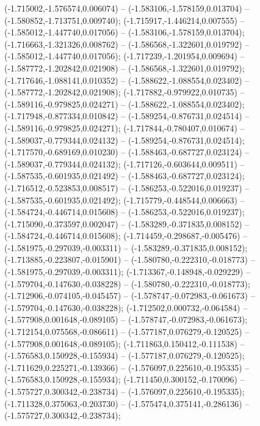  (-1.715002,-1.576574,0.006074) -- (-1.583106,-1.578159,0.013704) -- (-1.580852,-1.713751,0.009740);
 (-1.715917,-1.446214,0.007555) -- (-1.585012,-1.447740,0.017056) -- (-1.583106,-1.578159,0.013704);
 (-1.716663,-1.321326,0.008762) -- (-1.586568,-1.322601,0.019792) -- (-1.585012,-1.447740,0.017056);
 (-1.717239,-1.201954,0.009694) -- (-1.587772,-1.202842,0.021908) -- (-1.586568,-1.322601,0.019792);
 (-1.717646,-1.088141,0.010352) -- (-1.588622,-1.088554,0.023402) -- (-1.587772,-1.202842,0.021908);
 (-1.717882,-0.979922,0.010735) -- (-1.589116,-0.979825,0.024271) -- (-1.588622,-1.088554,0.023402);
 (-1.717948,-0.877334,0.010842) -- (-1.589254,-0.876731,0.024514) -- (-1.589116,-0.979825,0.024271);
 (-1.717844,-0.780407,0.010674) -- (-1.589037,-0.779344,0.024132) -- (-1.589254,-0.876731,0.024514);
 (-1.717570,-0.689169,0.010230) -- (-1.588463,-0.687727,0.023124) -- (-1.589037,-0.779344,0.024132);
 (-1.717126,-0.603644,0.009511) -- (-1.587535,-0.601935,0.021492) -- (-1.588463,-0.687727,0.023124);
 (-1.716512,-0.523853,0.008517) -- (-1.586253,-0.522016,0.019237) -- (-1.587535,-0.601935,0.021492);
 (-1.715779,-0.448544,0.006663) -- (-1.584724,-0.446714,0.015608) -- (-1.586253,-0.522016,0.019237);
 (-1.715090,-0.373597,0.002047) -- (-1.583289,-0.371835,0.008152) -- (-1.584724,-0.446714,0.015608);
 (-1.714459,-0.298687,-0.005476) -- (-1.581975,-0.297039,-0.003311) -- (-1.583289,-0.371835,0.008152);
 (-1.713885,-0.223807,-0.015901) -- (-1.580780,-0.222310,-0.018773) -- (-1.581975,-0.297039,-0.003311);
 (-1.713367,-0.148948,-0.029229) -- (-1.579704,-0.147630,-0.038228) -- (-1.580780,-0.222310,-0.018773);
 (-1.712906,-0.074105,-0.045457) -- (-1.578747,-0.072983,-0.061673) -- (-1.579704,-0.147630,-0.038228);
 (-1.712502,0.000732,-0.064584) -- (-1.577908,0.001648,-0.089105) -- (-1.578747,-0.072983,-0.061673);
 (-1.712154,0.075568,-0.086611) -- (-1.577187,0.076279,-0.120525) -- (-1.577908,0.001648,-0.089105);
 (-1.711863,0.150412,-0.111538) -- (-1.576583,0.150928,-0.155934) -- (-1.577187,0.076279,-0.120525);
 (-1.711629,0.225271,-0.139366) -- (-1.576097,0.225610,-0.195335) -- (-1.576583,0.150928,-0.155934);
 (-1.711450,0.300152,-0.170096) -- (-1.575727,0.300342,-0.238734) -- (-1.576097,0.225610,-0.195335);
 (-1.711328,0.375063,-0.203730) -- (-1.575474,0.375141,-0.286136) -- (-1.575727,0.300342,-0.238734);
